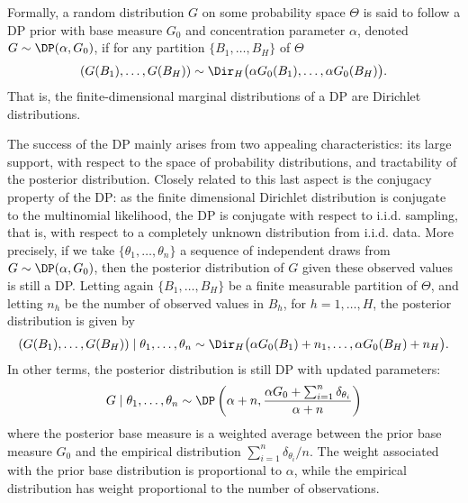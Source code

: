 Formally, a random distribution $G$ on some probability space $\Theta$ is said to follow a DP prior with base measure $G_0$ and concentration parameter $\alpha$, denoted $G\sim\DP(\alpha,G_0)$, if for any partition $\{B_1,\dots,B_H\}$ of $\Theta$
\begin{equation*}
(G(B_1),\dots,G(B_H)) \sim \Dir_H\big(\alpha G_0(B_1),\dots,\alpha G_0(B_H)\big).
\end{equation*}
That is, the finite-dimensional marginal distributions of a DP are Dirichlet distributions.

The success of the DP mainly arises from two appealing characteristics: its large support, with respect to the space of probability distributions, and tractability of the posterior distribution.
Closely related to this last aspect is the conjugacy property of the DP: as the finite dimensional Dirichlet distribution is conjugate to the multinomial likelihood, the DP is conjugate with respect to i.i.d. sampling, that is, with respect to a completely unknown distribution from i.i.d. data.
More precisely, if we take $\{\theta_1,\dots,\theta_n\}$ a sequence of independent draws from $G\sim\DP(\alpha,G_0)$, then the posterior distribution of $G$ given these observed values is still a DP. 
Letting again $\{B_1,\dots,B_H\}$ be a finite measurable partition of $\Theta$, and letting $n_h$ be the number of observed values in $B_h$, for $h = 1,\dots,H$, the posterior distribution is given by
\begin{equation*}
(G(B_1),\dots,G(B_H))\mid \theta_1,\dots,\theta_n \sim \Dir_H\big(\alpha G_0(B_1) + n_1,\dots,\alpha G_0(B_H) + n_H\big).
\end{equation*}
In other terms, the posterior distribution is still DP with updated parameters:
\begin{equation*}
G \mid \theta_1,\dots,\theta_n \sim \DP \left(\alpha + n, \frac{\alpha G_0 + \sum_{i=1}^n \delta_{\theta_i}}{\alpha + n} \right)
\end{equation*}
where the posterior base measure is a weighted average between the prior base measure $G_0$ and the empirical distribution $\sum_{i=1}^n \delta_{\theta_i} / n$.
The weight associated with the prior base distribution is proportional to $\alpha$, while the empirical distribution has weight proportional to the number of observations.


